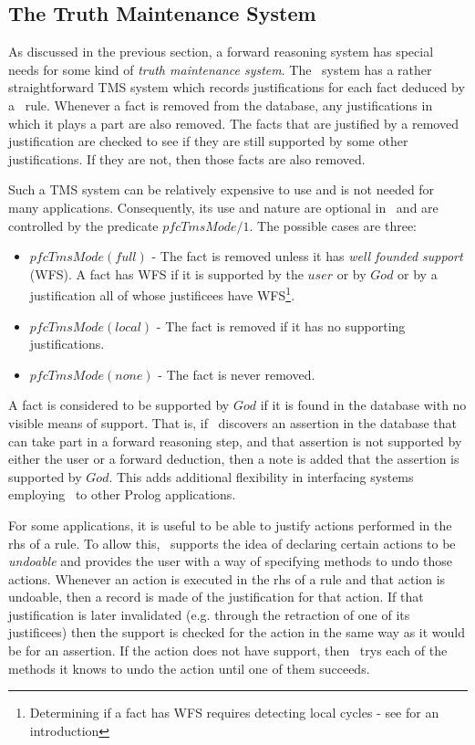 \subsection*{The Truth Maintenance System}

As discussed in the previous section, a forward reasoning system has
special needs for some kind of {\em truth maintenance system}.  The
\pfc\ system has a rather straightforward TMS system which records
justifications for each fact deduced by a \pfc\ rule.  Whenever a fact
is removed from the database, any justifications in which it plays a
part are also removed.  The facts that are justified by a removed
justification are checked to see if they are still supported by some
other justifications.  If they are not, then those facts are also
removed.

Such a TMS system can be relatively expensive to use and is not needed
for many applications.  Consequently, its use and nature are optional
in \pfc\ and are controlled by the predicate $pfcTmsMode/1$.  The
possible cases are three:
\begin{itemize}

\item $pfcTmsMode(full)$ - The fact is removed unless it has {\em well
found\-ed support} (WFS).  A fact has WFS if it is supported by the
$user$ or by $God$ or by a justification all of whose justificees have
WFS\footnote{Determining if a fact has WFS requires detecting local
cycles - see \cite{mcdermott85} for an introduction}.

\item $pfcTmsMode(local)$ - The fact is removed if it has no
supporting justifications.

\item $pfcTmsMode(none)$ -  The fact is never removed. 
\end{itemize}

A fact is considered to be supported by $God$ if it is found in the
database with no visible means of support.  That is, if \pfc\
discovers an assertion in the database that can take part in a forward
reasoning step, and that assertion is not supported by either the user
or a forward deduction, then a note is added that the assertion is
supported by $God$.  This adds additional flexibility in interfacing
systems employing \pfc\ to other Prolog applications.

For some applications, it is useful to be able to justify actions
performed in the rhs of a rule.  To allow this, \pfc\ supports the
idea of declaring certain actions to be {\em undoable} and provides
the user with a way of specifying methods to undo those actions.
Whenever an action is executed in the rhs of a rule and that action is
undoable, then a record is made of the justification for that action.
If that justification is later invalidated (e.g. through the
retraction of one of its justificees) then the support is checked for
the action in the same way as it would be for an assertion.  If the
action does not have support, then \pfc\ trys each of the methods it
knows to undo the action until one of them succeeds.

